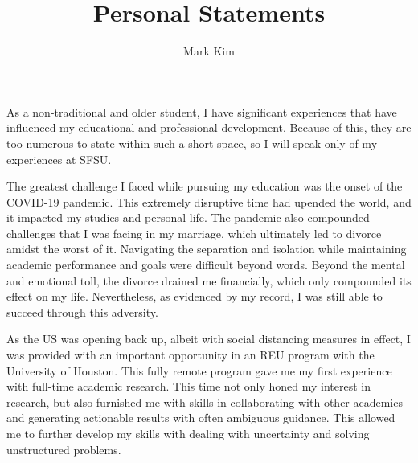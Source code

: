 \documentclass[12pt]{article}
\title{Personal Statements}
\author{Mark Kim}
\begin{document}
\maketitle

As a non-traditional and older student, I have significant experiences that have influenced my educational and professional development.
Because of this, they are too numerous to state within such a short space, so I will speak only of my experiences at SFSU.

The greatest challenge I faced while pursuing my education was the onset of the COVID-19 pandemic.  This extremely disruptive time had
upended the world, and it impacted my studies and personal life.  The pandemic also compounded challenges that I was facing in my marriage,
which ultimately led to divorce amidst the worst of it.  Navigating the separation and isolation while maintaining academic performance and
goals were difficult beyond words.  Beyond the mental and emotional toll, the divorce drained me financially, which only compounded its
effect on my life.  Nevertheless, as evidenced by my record, I was still able to succeed through this adversity.

As the US was opening back up, albeit with social distancing measures in effect, I was provided with an important opportunity in an REU
program with the University of Houston.  This fully remote program gave me my first experience with full-time academic research.  This time
not only honed my interest in research, but also furnished me with skills in collaborating with other academics and generating actionable
results with often ambiguous guidance.  This allowed me to further develop my skills with dealing with uncertainty and solving unstructured
problems.


\end{document}
